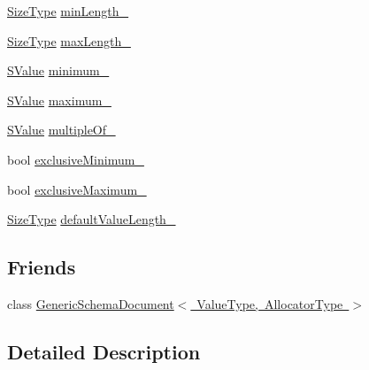 \begin{DoxyCompactItemize}
$$\item 
\mbox{\hyperlink{namespacerapidjson_a44eb33eaa523e36d466b1ced64b85c84}{Size\+Type}} \mbox{\hyperlink{classrapidjson_1_1internal_1_1_schema_a4ced2d5bfbc8557938c5fc4dc22f4c6c}{min\+Length\+\_\+}}
\item 
\mbox{\hyperlink{namespacerapidjson_a44eb33eaa523e36d466b1ced64b85c84}{Size\+Type}} \mbox{\hyperlink{classrapidjson_1_1internal_1_1_schema_a1bcb22c4ba18a8520058d56bd309514b}{max\+Length\+\_\+}}
\item 
\mbox{\hyperlink{classrapidjson_1_1internal_1_1_schema_a9f716b06fc542c4cdb7d8d5cf463bf79}{S\+Value}} \mbox{\hyperlink{classrapidjson_1_1internal_1_1_schema_a64490e0c1c6a4e4334a95c0ca15a5e7c}{minimum\+\_\+}}
\item 
\mbox{\hyperlink{classrapidjson_1_1internal_1_1_schema_a9f716b06fc542c4cdb7d8d5cf463bf79}{S\+Value}} \mbox{\hyperlink{classrapidjson_1_1internal_1_1_schema_a6cb5d8227b36b9c7b02ac57f3695884e}{maximum\+\_\+}}
\item 
\mbox{\hyperlink{classrapidjson_1_1internal_1_1_schema_a9f716b06fc542c4cdb7d8d5cf463bf79}{S\+Value}} \mbox{\hyperlink{classrapidjson_1_1internal_1_1_schema_ab884e6adad2de3943d5f947551315eac}{multiple\+Of\+\_\+}}
\item 
bool \mbox{\hyperlink{classrapidjson_1_1internal_1_1_schema_a060d0eacec9300cd3e371fdf6c988d90}{exclusive\+Minimum\+\_\+}}
\item 
bool \mbox{\hyperlink{classrapidjson_1_1internal_1_1_schema_a92c1c5d8021ecd20a9dc62414c0c0fbc}{exclusive\+Maximum\+\_\+}}
\item 
\mbox{\hyperlink{namespacerapidjson_a44eb33eaa523e36d466b1ced64b85c84}{Size\+Type}} \mbox{\hyperlink{classrapidjson_1_1internal_1_1_schema_ae5bc005527f8be03a966794d8a6b3051}{default\+Value\+Length\+\_\+}}
\end{DoxyCompactItemize}
\subsection*{Friends}
\begin{DoxyCompactItemize}
\item 
class \mbox{\hyperlink{classrapidjson_1_1internal_1_1_schema_a04f1d1acd0a5a7fda069c115970d52b3}{Generic\+Schema\+Document$<$ Value\+Type, Allocator\+Type $>$}}
\end{DoxyCompactItemize}


\subsection{Detailed Description}
